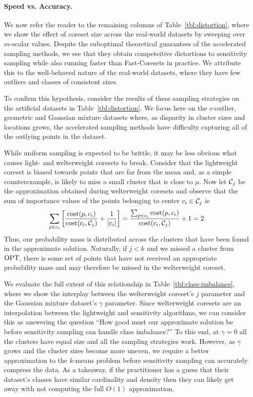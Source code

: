 \paragraph*{Speed vs. Accuracy.}

We now refer the reader to the remaining columns of Table~\ref{tbl:distortion}, where we show the effect of coreset size across the real-world datasets by
sweeping over $m$-scalar values. Despite the suboptimal theoretical guarantees of the accelerated sampling methods, we see that they obtain competeitive
distortions to sensitivity sampling while also running faster than Fast-Coresets in practice. We attribute this to the well-behaved nature of the real-world
datasets, where they have few outliers and classes of consistent sizes.

To confirm this hypothesis, consider the results of these sampling strategies on the artificial datasets in Table~\ref{tbl:distortion}. We focus here on
the $c$-outlier, geometric and Gaussian mixture datasets where, as disparity in cluster sizes and locations grows, the accelerated sampling methods have
difficulty capturing all of the outlying points in the dataset.

While uniform sampling is expected to be brittle, it may be less obvious what causes light- and welterweight coresets to break. Consider that the lightweight
coreset is biased towards points that are far from the mean and, as a simple counterexample, is likely to miss a small cluster that is close to $\mu$.  Now let
$\mathcal C_j$ be the approximation obtained during welterweight coresets and observe that the sum of importance values of the points belonging to center $c_i \in
\mathcal C_j$ is
\begin{equation*}
    \sum_{p \in c_i} \left[ \dfrac{\operatorname{cost}(p, c_i)}{\operatorname{cost}(c_i, \mathcal C_j)} + \dfrac{1}{|c_i|} \right]
    = \dfrac{\sum_{p \in c_i} \operatorname{cost}(p, c_i)}{\operatorname{cost}(c_i, \mathcal C_j)} + 1
    = 2
\end{equation*}
Thus, our probability mass is distributed across the clusters that have been found in the approximate solution. Naturally, if $j < k$ and we missed a cluster
from $\text{OPT}$, there is some set of points that have not received an appropriate probability mass and may therefore be missed in the welterweight coreset.

We evaluate the full extent of this relationship in Table~\ref{tbl:class-imbalance}, where we show the interplay between the welterweight coreset's $j$
parameter and the Gaussian mixture dataset's $\gamma$ parameter. Since welterweight coresets are an interpolation between the lightweight and sensitivity
algorithms, we can consider this as answering the question ``How good must our approximate solution be before sensitivity sampling can handle class imbalance?''
To this end, at $\gamma = 0$ all the clusters have equal size and all the sampling strategies work. However, as $\gamma$ grows and the cluster sizes become more
uneven, we require a better approximation to the $k$-means problem before sensitivity sampling can accurately compress the data. As a takeaway, if the
practitioner has a guess that their dataset's classes have similar cardinality and density then they can likely get away with not computing the full $O(1)$
approximation.

